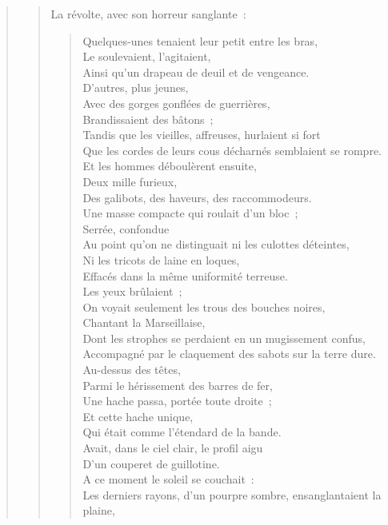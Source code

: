 \documentclass[french,twoside]{book} %
\begin{document}
\begin{verse}
\begin{verse}
\noindent La révolte, avec son horreur sanglante :\par


\begin{verse}
Quelques-unes tenaient leur petit entre les bras,\\
Le soulevaient, l’agitaient,\\
Ainsi qu’un drapeau de deuil et de vengeance.\\
D’autres, plus jeunes,\\
Avec des gorges gonflées de guerrières,\\
Brandissaient des bâtons ;\\
Tandis que les vieilles, affreuses, hurlaient si fort\\
Que les cordes de leurs cous décharnés semblaient se rompre.\\
Et les hommes déboulèrent ensuite,\\
Deux mille furieux,\\
Des galibots, des haveurs, des raccommodeurs.\\
Une masse compacte qui roulait d’un bloc ;\\
Serrée, confondue\\
Au point qu’on ne distinguait ni les culottes déteintes,\\
Ni les tricots de laine en loques,\\
Effacés dans la même uniformité terreuse.\\
Les yeux brûlaient ;\\
On voyait seulement les trous des bouches noires,\\
Chantant la Marseillaise,\\
Dont les strophes se perdaient en un mugissement confus,\\
Accompagné par le claquement des sabots sur la terre dure.\\
Au-dessus des têtes,\\
Parmi le hérissement des barres de fer,\\
Une hache passa, portée toute droite ;\\
Et cette hache unique,\\
Qui était comme l’étendard de la bande.\\
Avait, dans le ciel clair, le profil aigu\\
D’un couperet de guillotine.\\
A ce moment le soleil se couchait :\\
Les derniers rayons, d’un pourpre sombre, ensanglantaient la plaine,\\

\end{verse}
\end{verse}
\end{verse}
\end{document}
